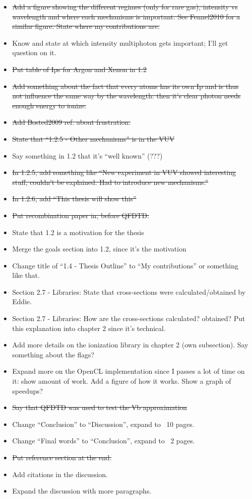 \begin{itemize}
{to shorter ones instead of stating each mechanisms.}
\item \sout{Add a figure showing the different regimes (only for rare gas), intensity
vs wavelength and where each mechanisms is important. See Fennel2010 for a
similar figure. State where my contributions are.}
\item Know and state at which intensity multiphoton gets important; I'll get
question on it.
\item \sout{Put table of Ips for Argon and Xenon in 1.2}
\item \sout{Add something about the fact that every atoms has its own Ip and is thus
not influence the same way by the wavelength: then it's clear photon needs
enough energy to ionize.}
\item \sout{Add Bosted2009 ref. about frustration.}
\item \sout{State that ``1.2.5 - Other mechanisms'' is in the VUV}
\item Say something in 1.2 that it's ``well known'' (???)
\item \sout{In 1.2.5, add something like ``New experiment in VUV showed interesting
stuff, couldn't be explained. Had to introduce new mechanisms.''}
\item \sout{In 1.2.6, add ``This thesis will show this''}
\item \sout{Put recombination paper in, before QFDTD.}
\item State that 1.2 is a motivation for the thesis
\item Merge the goals section into 1.2, since it's the motivation
\item Change title of ``1.4 - Thesis Outline'' to ``My contributions'' or
something like that.
\item Section 2.7 - Libraries: State that cross-sections were calculated/obtained
by Eddie.
\item Section 2.7 - Libraries: How are the cross-sections calculated? obtained?
Put this explanation into chapter 2 since it's technical.
\item Add more details on the ionization library in chapter 2 (own subsection).
Say something about the flags?
\item Expand more on the OpenCL implementation since I passes a lot of time on
it: show amount of work. Add a figure of how it works. Show a graph of speedups?
\item \sout{Say that QFDTD was used to test the Vb approximation}
\item Change ``Conclusion'' to ``Discussion'', expand to ~10 pages.
\item Change ``Final words'' to ``Conclusion'', expand to ~2 pages.
\item \sout{Put reference section at the end.}
\item Add citations in the discussion.
\item Expand the discussion with more paragraphs.
\end{itemize}

